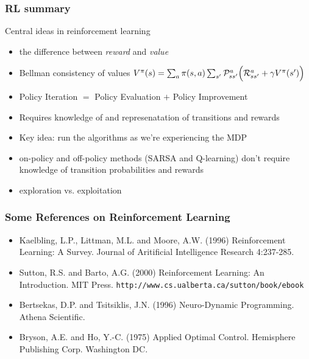 \begin{frame}
\frametitle{RL summary}

Central ideas in reinforcement learning
\begin{itemize}
\item the difference between \emph{reward} and \emph{value}
\item Bellman consistency of values $V^\pi(s)=\sum_a\pi(s,a)\sum_{s'}{\mathcal P}_{ss'}^a\Big({\mathcal R}_{ss'}^a+\gamma V^\pi(s')\Big)$
\item Policy Iteration $=$ Policy Evaluation $+$ Policy Improvement
\item Requires knowledge of and represenatation of transitions and rewards
\item Key idea: run the algorithms as we're experiencing the MDP
\item on-policy and off-policy methods (SARSA and Q-learning) don't
require knowledge of transition probabilities and rewards
\item exploration vs. exploitation
\end{itemize}
\end{frame}


\begin{frame}
\frametitle{Some References on Reinforcement Learning}

\begin{itemize}
\item{}
Kaelbling, L.P.,  Littman, M.L. and Moore, A.W. (1996) Reinforcement
Learning: A Survey. Journal of Aritificial Intelligence Research
4:237-285. 

\item{}
Sutton, R.S.  and Barto, A.G. (2000) Reinforcement Learning: An
Introduction. MIT Press. \texttt{http://www.cs.ualberta.ca/\maketilde sutton/book/ebook}

\item{}
Bertsekas, D.P. and Tsitsiklis, J.N. (1996) Neuro-Dynamic Programming.
Athena Scientific.

\item{} Bryson, A.E. and Ho, Y.-C. (1975) Applied Optimal
Control. Hemisphere Publishing Corp. Washington DC. 

\end{itemize}
\end{frame}

